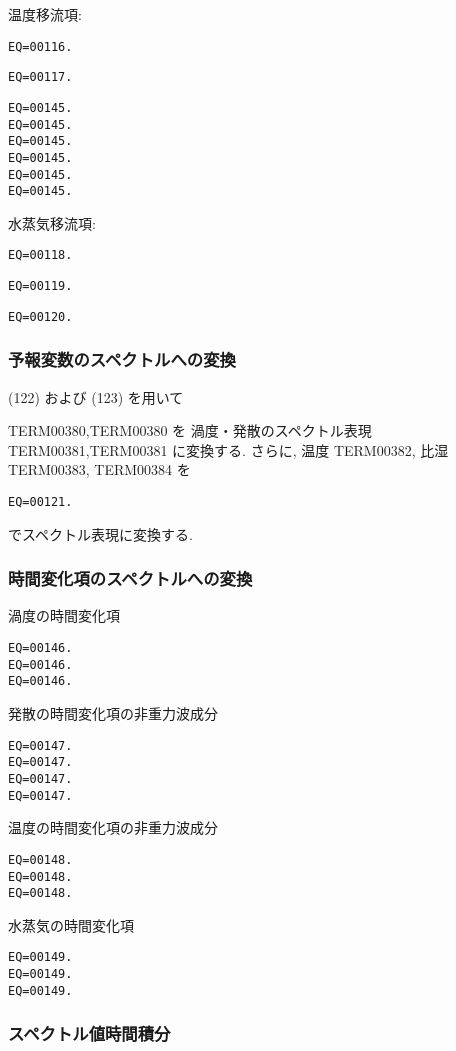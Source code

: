 温度移流項:
\begin{verbatim}
EQ=00116.
\end{verbatim}
\begin{verbatim}
EQ=00117.
\end{verbatim}
%
\begin{verbatim}
EQ=00145.
EQ=00145.
EQ=00145.
EQ=00145.
EQ=00145.
EQ=00145.
\end{verbatim}

水蒸気移流項:
\begin{verbatim}
EQ=00118.
\end{verbatim}
\begin{verbatim}
EQ=00119.
\end{verbatim}
%
\begin{verbatim}
EQ=00120.
\end{verbatim}

\subsubsection{予報変数のスペクトルへの変換}

(122) および
(123) を用いて

TERM00380,TERM00380 を
渦度・発散のスペクトル表現
TERM00381,TERM00381 に変換する.
さらに,
温度 TERM00382, 比湿 TERM00383, 
TERM00384 を
\begin{verbatim}
EQ=00121.
\end{verbatim}
でスペクトル表現に変換する.

\subsubsection{時間変化項のスペクトルへの変換}

渦度の時間変化項
\begin{verbatim}
EQ=00146.
EQ=00146.
EQ=00146.
\end{verbatim}
%
発散の時間変化項の非重力波成分
\begin{verbatim}
EQ=00147.
EQ=00147.
EQ=00147.
EQ=00147.
\end{verbatim}
%
温度の時間変化項の非重力波成分
\begin{verbatim}
EQ=00148.
EQ=00148.
EQ=00148.
\end{verbatim}
%
水蒸気の時間変化項
\begin{verbatim}
EQ=00149.
EQ=00149.
EQ=00149.
\end{verbatim}

\subsubsection{スペクトル値時間積分}

